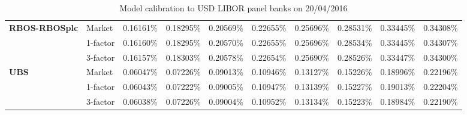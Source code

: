 \documentclass[12pt,a4paper]{article}
\theoremstyle{plain}
\numberwithin{equation}{section}
\begin{document}
\begin{table}[t]
{\begin{tabular}{|rl|cccccccc|}
    \midrule
    \midrule
    \multicolumn{1}{|l}{\textbf{RBOS-RBOSplc}} & Market & 0.16161\% & 0.18295\% & 0.20569\% & 0.22655\% & 0.25696\% & 0.28531\% & 0.33445\% & 0.34308\% \\
\cmidrule{3-10}          & 1-factor & 0.16160\% & 0.18295\% & 0.20570\% & 0.22655\% & 0.25696\% & 0.28534\% & 0.33445\% & 0.34307\% \\
          & 3-factor & 0.16157\% & 0.18303\% & 0.20578\% & 0.22654\% & 0.25690\% & 0.28526\% & 0.33447\% & 0.34300\% \\
    \midrule
    \midrule
    \multicolumn{1}{|l}{\textbf{UBS}} & Market & 0.06047\% & 0.07226\% & 0.09013\% & 0.10946\% & 0.13127\% & 0.15226\% & 0.18996\% & 0.22196\% \\
\cmidrule{3-10}          & 1-factor & 0.06043\% & 0.07222\% & 0.09005\% & 0.10947\% & 0.13139\% & 0.15227\% & 0.19013\% & 0.22204\% \\
          & 3-factor & 0.06038\% & 0.07226\% & 0.09004\% & 0.10952\% & 0.13134\% & 0.15223\% & 0.18984\% & 0.22190\% \\
    \bottomrule
    \end{tabular}%
    }
     \caption{Model calibration to USD LIBOR panel banks on 20/04/2016 }
  \label{CDSfit160420}%
\end{table}%
\end{document}
